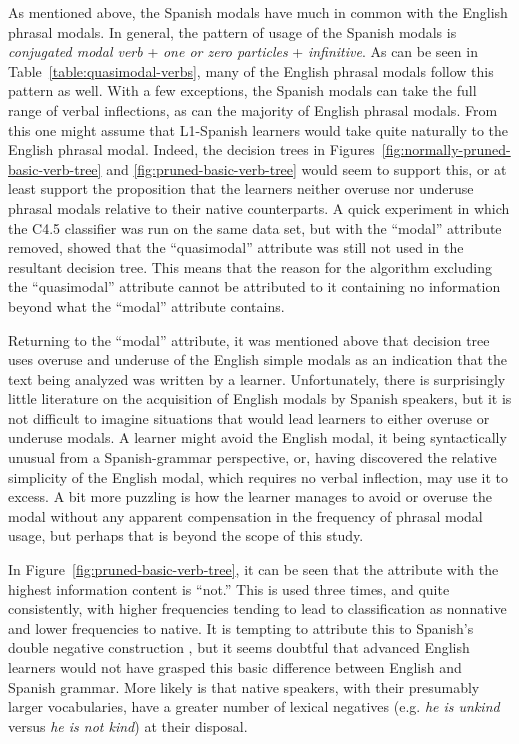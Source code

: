 \documentclass[main.tex]{subfiles}
\begin{document}
As mentioned above, the Spanish modals have much in common with the English phrasal modals. In general, the pattern of usage of the Spanish modals is \textit{conjugated modal verb} + \textit{one or zero particles} + \textit{infinitive}. As can be seen in Table~\ref{table:quasimodal-verbs}, many of the English phrasal modals follow this pattern as well. With a few exceptions, the Spanish modals can take the full range of verbal inflections, as can the majority of English phrasal modals. From this one might assume that L1-Spanish learners would take quite naturally to the English phrasal modal. Indeed, the decision trees in Figures~\ref{fig:normally-pruned-basic-verb-tree} and \ref{fig:pruned-basic-verb-tree} would seem to support this, or at least support the proposition that the learners neither overuse nor underuse phrasal modals relative to their native counterparts. A quick experiment in which the C4.5 classifier was run on the same data set, but with the ``modal'' attribute removed, showed that the ``quasimodal'' attribute was still not used in the resultant decision tree. This means that the reason for the algorithm excluding the ``quasimodal'' attribute cannot be attributed to it containing no information beyond what the ``modal'' attribute contains.

Returning to the ``modal'' attribute, it was mentioned above that decision tree uses overuse and underuse of the English simple modals as an indication that the text being analyzed was written by a learner. Unfortunately, there is surprisingly little literature on the acquisition of English modals by Spanish speakers, but it is not difficult to imagine situations that would lead learners to either overuse or underuse modals. A learner might avoid the English modal, it being syntactically unusual from a Spanish-grammar perspective, or, having discovered the relative simplicity of the English modal, which requires no verbal inflection, may use it to excess. A bit more puzzling is how the learner manages to avoid or overuse the modal without any apparent compensation in the frequency of phrasal modal usage, but perhaps that is beyond the scope of this study.

In Figure~\ref{fig:pruned-basic-verb-tree}, it can be seen that the attribute with the highest information content is ``not.'' This is used three times, and quite consistently, with higher frequencies tending to lead to classification as nonnative and lower frequencies to native. It is tempting to attribute this to Spanish's double negative construction \citep[ch. 23.3]{butt}, but it seems doubtful that advanced English learners would not have grasped this basic difference between English and Spanish grammar. More likely is that native speakers, with their presumably larger vocabularies, have a greater number of lexical negatives (e.g. \textit{he is unkind} versus \textit{he is not kind}) at their disposal.
\end{document}

